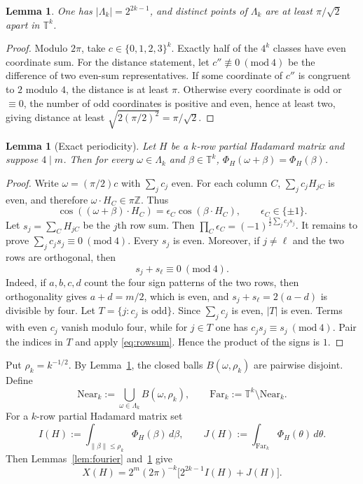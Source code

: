 \documentclass[11pt,reqno]{amsart}
\theoremstyle{plain}
\newtheorem{lemma}[theorem]{Lemma}
\theoremstyle{definition}
\theoremstyle{remark}
\newcommand{\T}{\mathbb T}
\newcommand{\Z}{\mathbb Z}
\begin{document}
\begin{lemma}\label{lem:lattice}
One has \(|\Lambda_k|=2^{2k-1}\), and distinct points of \(\Lambda_k\) are at
least \(\pi/\sqrt2\) apart in \(\T^k\).
\end{lemma}

\begin{proof}
Modulo \(2\pi\), take \(c\in\{0,1,2,3\}^k\). Exactly half of the \(4^k\)
classes have even coordinate sum. For the distance statement, let
\(c''\not\equiv0\ (\mathrm{mod}\ 4)\) be the difference of two even-sum
representatives. If some coordinate of \(c''\) is congruent to \(2\) modulo
\(4\), the distance is at least \(\pi\). Otherwise every coordinate is odd or
\(\equiv0\), the number of odd coordinates is positive and even, hence at least
two, giving distance at least \(\sqrt{2(\pi/2)^2}=\pi/\sqrt2\).
\end{proof}

\begin{lemma}[Exact periodicity]\label{lem:periodic}
Let \(H\) be a \(k\)-row partial Hadamard matrix and suppose \(4\mid m\). Then
for every \(\omega\in\Lambda_k\) and \(\beta\in\T^k\),
\(\Phi_H(\omega+\beta)=\Phi_H(\beta)\).
\end{lemma}

\begin{proof}
Write \(\omega=(\pi/2)c\) with \(\sum_jc_j\) even. For each column \(C\),
\(\sum_jc_jH_{jC}\) is even, and therefore \(\omega\cdot H_C\in\pi\Z\). Thus
\[
  \cos((\omega+\beta)\cdot H_C)=\epsilon_C\cos(\beta\cdot H_C),
  \qquad\epsilon_C\in\{\pm1\}.
\]
Let \(s_j=\sum_CH_{jC}\) be the \(j\)th row sum. Then
\(\prod_C\epsilon_C=(-1)^{\frac12\sum_jc_js_j}\). It remains to prove
\(\sum_jc_js_j\equiv0\ (\mathrm{mod}\ 4)\). Every \(s_j\) is even. Moreover, if
\(j\ne\ell\) and the two rows are orthogonal, then
\begin{equation}\label{eq:rowsum}
  s_j+s_\ell\equiv0\ (\mathrm{mod}\ 4).
\end{equation}
Indeed, if \(a,b,c,d\) count the four sign patterns of the two rows, then
orthogonality gives \(a+d=m/2\), which is even, and \(s_j+s_\ell=2(a-d)\) is
divisible by four. Let \(T=\{j:c_j\text{ is odd}\}\). Since \(\sum_jc_j\) is
even, \(|T|\) is even. Terms with even \(c_j\) vanish modulo four, while for
\(j\in T\) one has \(c_js_j\equiv s_j\ (\mathrm{mod}\ 4)\). Pair the indices in
\(T\) and apply \eqref{eq:rowsum}. Hence the product of the signs is \(1\).
\end{proof}

Put \(\rho_k=k^{-1/2}\). By Lemma~\ref{lem:lattice}, the closed balls
\(B(\omega,\rho_k)\) are pairwise disjoint. Define
\[
  \mathrm{Near}_k:=\bigcup_{\omega\in\Lambda_k}B(\omega,\rho_k),\qquad
  \mathrm{Far}_k:=\T^k\setminus\mathrm{Near}_k.
\]
For a \(k\)-row partial Hadamard matrix set
\[
  I(H):=\int_{\|\beta\|\le\rho_k}\Phi_H(\beta)\,d\beta,\qquad
  J(H):=\int_{\mathrm{Far}_k}\Phi_H(\theta)\,d\theta.
\]
Then Lemmas~\ref{lem:fourier} and~\ref{lem:periodic} give
\begin{equation}\label{eq:split}
  X(H)=2^m(2\pi)^{-k}\bigl[2^{2k-1}I(H)+J(H)\bigr].
\end{equation}
\end{document}
